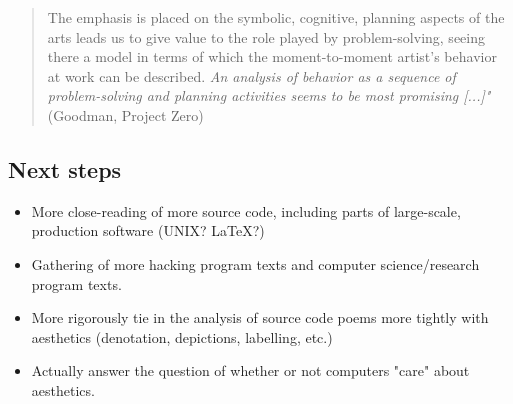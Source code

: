 \documentclass{article}
\begin{document}
\begin{quote}
    The emphasis is placed on the symbolic, cognitive, planning aspects of the arts leads us to give value to the role played by problem-solving, seeing there a model in terms of which the moment-to-moment artist’s behavior at work can be described. \emph{An analysis of behavior as a sequence of problem-solving and planning activities seems to be most promising [...]"} (Goodman, Project Zero)
\end{quote}

\subsection{Next steps}

\begin{itemize}
  \item More close-reading of more source code, including parts of large-scale, production software (UNIX? LaTeX?)
  \item Gathering of more hacking program texts and computer science/research program texts.
  \item More rigorously tie in the analysis of source code poems more tightly with aesthetics (denotation, depictions, labelling, etc.)
  \item Actually answer the question of whether or not computers "care" about aesthetics.
\end{itemize}



\end{document}
